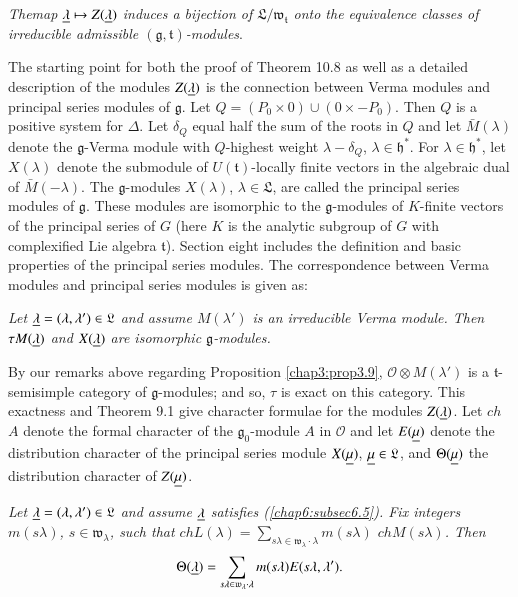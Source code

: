\medskip
{}
\textit{The\pageoriginale map $\underline{\lambda} \mapsto Z(\underline{\lambda})$ induces a
bijection of $\mathfrak{L}/\mathfrak{w}_\mathfrak{t}$ onto the
equivalence classes of irreducible admissible $(\mathfrak{g},
\mathfrak{t})$-modules}.

The starting point for both the proof of Theorem 10.8 as well as a
detailed description of the modules $Z(\underline{\lambda})$ is the connection
between Verma modules and principal series modules of
$\mathfrak{g}$. Let $Q = (P_0 \times 0) \cup (0 \times - P_0)$. Then
$Q$ is a positive system for $\Delta$. Let $\delta_Q$ equal half the
sum of the roots in $Q$ and let $\bar{M}(\lambda)$ denote the
$\mathfrak{g}$-Verma module with $Q$-highest weight $\lambda -
\delta_Q$, $\lambda \in \mathfrak{h}^*$. For $\lambda \in
\mathfrak{h}^*$, let $X(\lambda)$ denote the submodule of
$U(\mathfrak{t})$-locally finite vectors in the algebraic dual of
$\bar{M}(-\lambda)$. The $\mathfrak{g}$-modules $X(\lambda)$, $\lambda
\in \mathfrak{L}$, are called the principal series modules of
$\mathfrak{g}$. These modules are isomorphic to the
$\mathfrak{g}$-modules of $K$-finite vectors of the principal series
of $G$ (here $K$ is the analytic subgroup of $G$ with complexified Lie
algebra $\mathfrak{t}$). Section eight includes the definition and
basic properties of the principal series modules. The correspondence
between Verma modules and principal series modules is given as:

\medskip
{}
\textit{Let $\underline{\lambda} = (\lambda, \lambda') \in \mathfrak{L}$ and
  assume $M(\lambda')$ is an irreducible Verma module. Then $\tau M
  (\underline{\lambda})$ and $X(\underline{\lambda})$ are isomorphic
  $\mathfrak{g}$-modules.} 

By our remarks above regarding Proposition \ref{chap3:prop3.9}, $\mathscr{O} \otimes
M(\lambda')$ is a $\mathfrak{t}$-semisimple category of
$\mathfrak{g}$-modules; and so, $\tau$ is exact on this category. This
exactness and Theorem 9.1 give character formulae for the modules $Z
(\underline{\lambda})$. Let $ch$ $A$ denote the formal character of the
$\mathfrak{g}_0$-module $A$ in $\mathscr{O}$ and let $E(\underline{\mu})$
denote the distribution character of the principal series module
$X(\underline{\mu})$, $\underline{\mu} \in \mathfrak{L}$, and $\Theta (\underline{\mu})$ the
distribution character of $Z(\underline{\mu})$.

\medskip
{}
\textit{Let \pageoriginale $\underline{\lambda} = (\lambda, \lambda') \in
\mathfrak{L}$ and assume $\underline{\lambda}$ satisfies
(\ref{chap6:subsec6.5}). Fix integers $m(s\lambda)$, $s \in
\mathfrak{w}_\lambda$, such that $chL(\lambda) = \sum\limits_{s
  \lambda \in \mathfrak{w}_\lambda \cdot \lambda} m(s\lambda) $
$chM(s\lambda)$. Then} 
$$
\Theta (\underline{\lambda}) = \sum\limits_{s \lambda \in \mathfrak{w}_\lambda
\cdot \lambda} m (s\lambda)  E (s\lambda,\lambda').
$$

